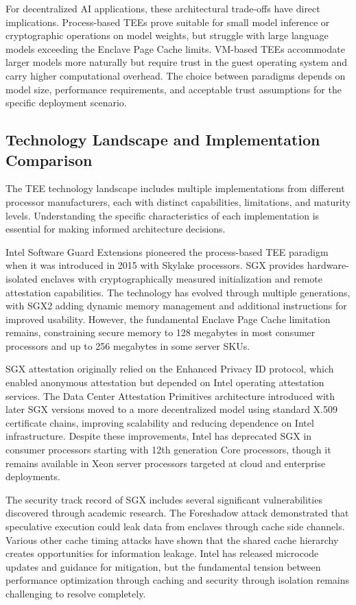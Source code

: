 For decentralized AI applications, these architectural trade-offs have direct implications. Process-based TEEs prove suitable for small model inference or cryptographic operations on model weights, but struggle with large language models exceeding the Enclave Page Cache limits. VM-based TEEs accommodate larger models more naturally but require trust in the guest operating system and carry higher computational overhead. The choice between paradigms depends on model size, performance requirements, and acceptable trust assumptions for the specific deployment scenario.

\subsection{Technology Landscape and Implementation Comparison}

The TEE technology landscape includes multiple implementations from different processor manufacturers, each with distinct capabilities, limitations, and maturity levels. Understanding the specific characteristics of each implementation is essential for making informed architecture decisions.

Intel Software Guard Extensions pioneered the process-based TEE paradigm when it was introduced in 2015 with Skylake processors. SGX provides hardware-isolated enclaves with cryptographically measured initialization and remote attestation capabilities. The technology has evolved through multiple generations, with SGX2 adding dynamic memory management and additional instructions for improved usability. However, the fundamental Enclave Page Cache limitation remains, constraining secure memory to 128 megabytes in most consumer processors and up to 256 megabytes in some server SKUs.

SGX attestation originally relied on the Enhanced Privacy ID protocol, which enabled anonymous attestation but depended on Intel operating attestation services. The Data Center Attestation Primitives architecture introduced with later SGX versions moved to a more decentralized model using standard X.509 certificate chains, improving scalability and reducing dependence on Intel infrastructure. Despite these improvements, Intel has deprecated SGX in consumer processors starting with 12th generation Core processors, though it remains available in Xeon server processors targeted at cloud and enterprise deployments.

The security track record of SGX includes several significant vulnerabilities discovered through academic research. The Foreshadow attack demonstrated that speculative execution could leak data from enclaves through cache side channels. Various other cache timing attacks have shown that the shared cache hierarchy creates opportunities for information leakage. Intel has released microcode updates and guidance for mitigation, but the fundamental tension between performance optimization through caching and security through isolation remains challenging to resolve completely.

